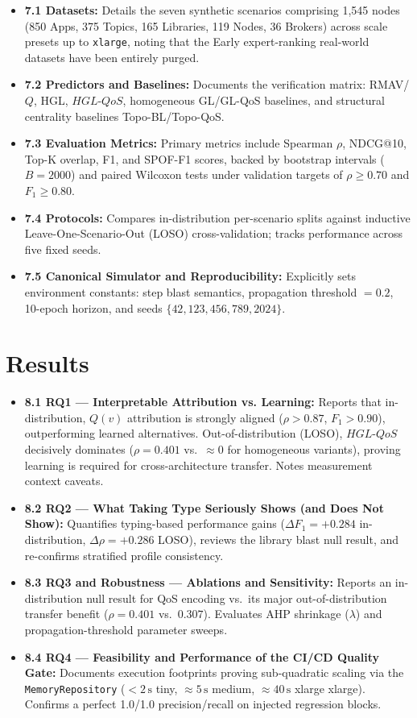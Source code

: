\documentclass[review]{elsarticle}
\begin{document}
\begin{itemize}[leftmargin=*]
  \item \textbf{7.1 Datasets:} Details the seven synthetic scenarios comprising 1,545 nodes (850 Apps, 375 Topics, 165 Libraries, 119 Nodes, 36 Brokers) across scale presets up to \texttt{xlarge}, noting that the Early expert-ranking real-world datasets have been entirely purged.
  \item \textbf{7.2 Predictors and Baselines:} Documents the verification matrix: RMAV/$Q$, HGL, $HGL\text{-}QoS$, homogeneous GL/GL-QoS baselines, and structural centrality baselines Topo-BL/Topo-QoS.
  \item \textbf{7.3 Evaluation Metrics:} Primary metrics include Spearman $\rho$, NDCG@10, Top-K overlap, F1, and SPOF-F1 scores, backed by bootstrap intervals ($B=2000$) and paired Wilcoxon tests under validation targets of $\rho \ge 0.70$ and $F_1 \ge 0.80$.
  \item \textbf{7.4 Protocols:} Compares in-distribution per-scenario splits against inductive Leave-One-Scenario-Out (LOSO) cross-validation; tracks performance across five fixed seeds.
  \item \textbf{7.5 Canonical Simulator and Reproducibility:} Explicitly sets environment constants: step blast semantics, propagation threshold $= 0.2$, 10-epoch horizon, and seeds $\{42, 123, 456, 789, 2024\}$.
\end{itemize}

\section{Results}

\begin{itemize}[leftmargin=*]
  \item \textbf{8.1 RQ1 --- Interpretable Attribution vs. Learning:} Reports that in-distribution, $Q(v)$ attribution is strongly aligned ($\rho > 0.87$, $F_1 > 0.90$), outperforming learned alternatives. Out-of-distribution (LOSO), $HGL\text{-}QoS$ decisively dominates ($\rho = 0.401$ vs.\ $\approx 0$ for homogeneous variants), proving learning is required for cross-architecture transfer. Notes measurement context caveats.
  \item \textbf{8.2 RQ2 --- What Taking Type Seriously Shows (and Does Not Show):} Quantifies typing-based performance gains ($\Delta F_1 = +0.284$ in-distribution, $\Delta\rho = +0.286$ LOSO), reviews the library blast null result, and re-confirms stratified profile consistency.
  \item \textbf{8.3 RQ3 and Robustness --- Ablations and Sensitivity:} Reports an in-distribution null result for QoS encoding vs.\ its major out-of-distribution transfer benefit ($\rho = 0.401$ vs.\ $0.307$). Evaluates AHP shrinkage ($\lambda$) and propagation-threshold parameter sweeps.
  \item \textbf{8.4 RQ4 --- Feasibility and Performance of the CI/CD Quality Gate:} Documents execution footprints proving sub-quadratic scaling via the \texttt{MemoryRepository} ($<2\,\text{s}$ tiny, $\approx 5\,\text{s}$ medium, $\approx 40\,\text{s}$ xlarge xlarge). Confirms a perfect 1.0/1.0 precision/recall on injected regression blocks.
\end{itemize}
\end{document}
